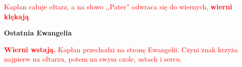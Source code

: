 \begin{center}
\textcolor{red}{Kapłan całuje ołtarz, a na słowo ,,Pater'' odwraca się do wiernych, \textbf{wierni klękają}}
\end{center}

\begin{Parallel}[v]{0.485\textwidth}{0.485\textwidth}

\end{Parallel}

\begin{center}
\textbf{Ostatnia Ewangelia}
\end{center}

\begin{center}
\textcolor{red}{\textbf{Wierni wstają.} Kapłan przechodzi na stronę Ewangelii. Czyni znak krzyża najpierw na ołtarzu, potem na swym czole, ustach i sercu.}
\end{center}

